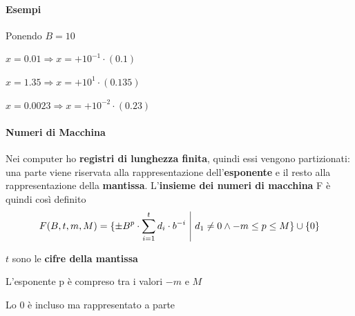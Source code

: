 \documentclass[10pt]{book}
\begin{document}
\paragraph{Esempi} Ponendo $B = 10$
\begin{list}{}{}
	\item $x = 0.01 \Rightarrow x = +10^{-1}\cdot(0.1)$
	\item $x = 1.35 \Rightarrow x = +10^1\cdot(0.135)$
	\item $x = 0.0023 \Rightarrow x = +10^{-2}\cdot(0.23)$
\end{list}
\paragraph{Numeri di Macchina} Nei computer ho \textbf{registri di lunghezza finita}, quindi essi vengono partizionati: una parte viene riservata alla rappresentazione dell'\textbf{esponente} e il resto alla rappresentazione della \textbf{mantissa}. L'\textbf{insieme dei numeri di macchina} F è quindi così definito
$$F(B, t, m, M) = \{\pm B^p \cdot \sum_{i=1}^t d_i \cdot b^{-i}\:\:\vline\:\: d_1 \neq 0 \wedge -m \leq p \leq M\} \cup \{0\}$$
\begin{list}{}{dove}
	\item $t$ sono le \textbf{cifre della mantissa}
	\item L'esponente p è compreso tra i valori $-m$ e $M$
	\item Lo 0 è incluso ma rappresentato a parte
\end{list}
\end{document}
